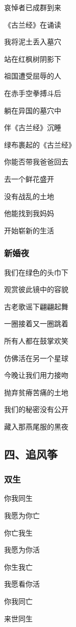 \documentclass[openany,scheme = chinese, linespread = 1.5]{ctexbook}
\begin{document}
\begin{center}
哀悼者已成群到来

《古兰经》在诵读

我将泥土丢入墓穴

站在红枫树阴影下

祖国遭受屈辱的人

在赤手空拳搏斗后

躺在异国的墓穴中

伴《古兰经》沉睡

绿布裹起的《古兰经》

你能否带我爸爸回去

去一个鲜花盛开

没有战乱的土地

他能找到我妈妈

开始崭新的生活
\end{center}

\subsubsection*{新婚夜}

\begin{center}
我们在绿色的头巾下

观赏彼此镜中的容貌

古老歌谣下翩翩起舞

一圈接着又一圈跳着

所有人都在鼓掌欢笑

仿佛活在另一个星球

今晚让我们用力接吻

抛弃贫瘠苦痛的土地

我们的秘密没有公开

藏入那燕尾服的黑夜
\end{center}

\subsection*{四、追风筝}
     
\subsubsection*{双生}

\begin{center}

你我同生

我愿为你亡

你亡我生

我愿为你活

你生我亡

我愿看你活

你我同亡

来世同生
\end{center}
\end{document}
